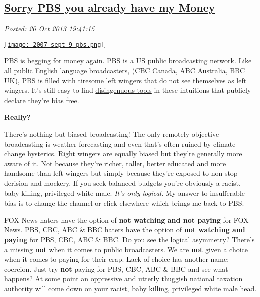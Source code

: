 %

\subsection*{\href{https://bakerjd99.wordpress.com/2013/10/20/sorry-pbs-you-already-have-my-money/}{Sorry PBS you already have my Money}}


\noindent\emph{Posted: 20 Oct 2013 19:41:15}
\vspace{6pt}

\captionsetup[floatingfigure]{labelformat=empty}
\begin{floatingfigure}[r]{0.40\textwidth}
\centering
\href{http://www.freneticfunnies.com/weeklies/2007-sept-9-PBS.php}{\texttt{[image: 2007-sept-9-pbs.png]}}
\label{fig:4308X0}
\end{floatingfigure} PBS
is begging for money again. \href{http://www.pbs.org/}{PBS} is a US
public broadcasting network. Like all public English language
broadcasters, (CBC Canada, ABC Australia, BBC UK), PBS is filled with
tiresome left wingers that do not see themselves as left wingers. It's
still easy to find \href{http://billmoyers.com/}{disingenuous tools} in
these intuitions that publicly declare they're bias free.

\textbf{Really?}

There's nothing but biased broadcasting! The only remotely objective
broadcasting is weather forecasting and even that's often ruined by
climate change hysterics. Right wingers are equally biased but they're
generally more aware of it. Not because they're richer, taller, better
educated and more handsome than left wingers but simply because they're
exposed to non-stop derision and mockery. If you seek balanced budgets
you're obviously a racist, baby killing, privileged white male.
\emph{It's only logical.} My answer to insufferable bias is to change
the channel or click elsewhere which brings me back to PBS.

FOX News haters have the option of \textbf{not watching and not paying}
for FOX News. PBS, CBC, ABC \& BBC haters have the option of \textbf{not
watching and paying} for PBS, CBC, ABC \& BBC. Do you see the logical
asymmetry? There's a missing \textbf{not} when it comes to public
broadcasters. We are \textbf{not} given a choice when it comes to paying
for their crap. Lack of choice has another name: coercion. Just try
\textbf{not} paying for PBS, CBC, ABC \& BBC and see what happens? At
some point an oppressive and utterly thuggish national taxation
authority will come down on your racist, baby killing, privileged white
male head.


